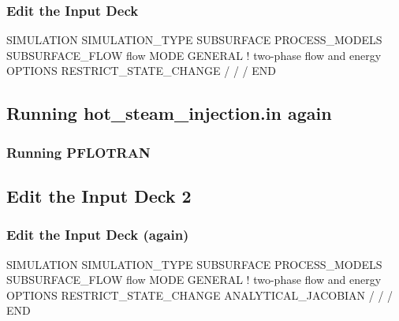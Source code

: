 \documentclass{beamer}
\begin{document}
\begin{frame}[fragile]\frametitle{Edit the Input Deck}

\begin{semiverbatim}

SIMULATION
  SIMULATION_TYPE SUBSURFACE
  PROCESS_MODELS
    SUBSURFACE_FLOW flow
      MODE GENERAL ! two-phase flow and energy
      OPTIONS
        RESTRICT_STATE_CHANGE
      /
    /
  /
END

\end{semiverbatim}

\end{frame}
\subsection{Running hot_steam_injection.in again}

\begin{frame}[fragile]\frametitle{Running PFLOTRAN}


\end{frame}

\subsection{Edit the Input Deck 2}

\begin{frame}[fragile]\frametitle{Edit the Input Deck (again)}

\begin{semiverbatim}

SIMULATION
  SIMULATION_TYPE SUBSURFACE
  PROCESS_MODELS
    SUBSURFACE_FLOW flow
      MODE GENERAL ! two-phase flow and energy
      OPTIONS
        RESTRICT_STATE_CHANGE
        ANALYTICAL_JACOBIAN
      /
    /
  /
END

\end{semiverbatim}

\end{frame}

\end{document}
